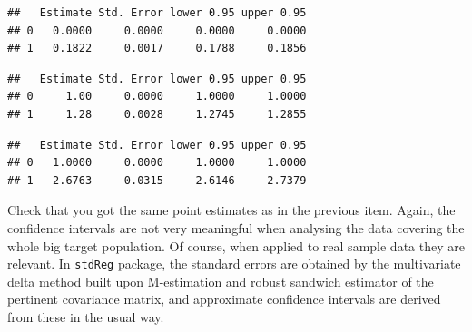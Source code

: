 \documentclass[
]{book}
\newenvironment{Shaded}{\begin{snugshade}}{\end{snugshade}}
\newcommand{\AttributeTok}[1]{\textcolor[rgb]{0.13,0.29,0.53}{#1}}
\newcommand{\DecValTok}[1]{\textcolor[rgb]{0.00,0.00,0.81}{#1}}
\newcommand{\FunctionTok}[1]{\textcolor[rgb]{0.13,0.29,0.53}{\textbf{#1}}}
\newcommand{\NormalTok}[1]{#1}
\newcommand{\SpecialCharTok}[1]{\textcolor[rgb]{0.81,0.36,0.00}{\textbf{#1}}}
\newcommand{\StringTok}[1]{\textcolor[rgb]{0.31,0.60,0.02}{#1}}
\begin{document}
\begin{Shaded}
\end{Shaded}

\begin{verbatim}
##   Estimate Std. Error lower 0.95 upper 0.95
## 0   0.0000     0.0000     0.0000     0.0000
## 1   0.1822     0.0017     0.1788     0.1856
\end{verbatim}

\begin{Shaded}
\end{Shaded}

\begin{verbatim}
##   Estimate Std. Error lower 0.95 upper 0.95
## 0     1.00     0.0000     1.0000     1.0000
## 1     1.28     0.0028     1.2745     1.2855
\end{verbatim}

\begin{Shaded}
\end{Shaded}

\begin{verbatim}
##   Estimate Std. Error lower 0.95 upper 0.95
## 0   1.0000     0.0000     1.0000     1.0000
## 1   2.6763     0.0315     2.6146     2.7379
\end{verbatim}

Check that you got the same point estimates as in the previous item.
Again, the confidence intervals are not very meaningful when
analysing the data covering the whole
big target population. Of course, when applied to real sample data they are
relevant. In \texttt{stdReg} package, the standard errors are
obtained by the multivariate delta method
built upon M-estimation and robust sandwich estimator of the
pertinent covariance matrix,
and approximate confidence intervals are derived from these
in the usual way.
\end{document}
